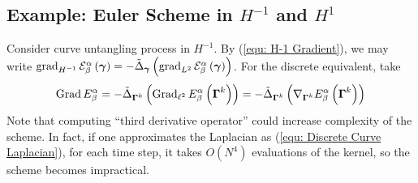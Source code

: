 \documentclass[../dissertation.tex]{subfiles}
\begin{document}
\subsection{Example: Euler Scheme in $H^{-1}$ and $H^1$}
\label{sct: Example: Euler Scheme in Other Spaces}
Consider curve untangling process in $H^{-1}$.
By (\ref{equ: H-1 Gradient}), we may write $\operatorname{grad}_{H^{-1}} \mathcal{E}_{\beta}^{\alpha} \left( \boldsymbol{\gamma} \right) = - \tilde{\Delta}_{\boldsymbol{\gamma}} \left( \operatorname{grad}_{L^2} \mathcal{E}_{\beta}^{\alpha} \left( \boldsymbol{\gamma} \right)\right)$.
For the discrete equivalent, take
\begin{equation}
    \operatorname{Grad} E_{\beta}^{\alpha} = - \tilde{\Delta}_{\boldsymbol{\Gamma}^k} \left( \operatorname{Grad}_{\ell^2} E_{\beta}^{\alpha} \left( \boldsymbol{\Gamma}^k \right) \right) = - \tilde{\Delta}_{\boldsymbol{\Gamma}^k} \left( \nabla_{\boldsymbol{\Gamma}^k} E_{\beta}^{\alpha} \left( \boldsymbol{\Gamma}^k \right) \right)
\end{equation}
Note that computing ``third derivative operator'' %
could increase complexity of the scheme.
In fact, if one approximates the Laplacian as (\ref{equ: Discrete Curve Laplacian}), 
for each time step, it takes $O \left( N^4 \right)$ evaluations of the kernel, so the scheme becomes impractical.
\end{document}
